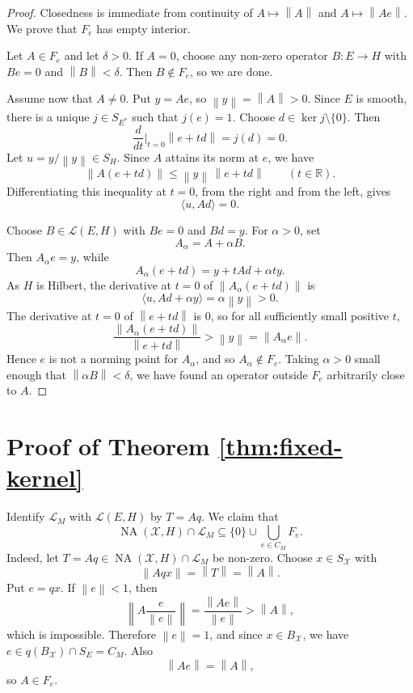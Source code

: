 \documentclass[11pt]{article}
\newcommand{\X}{\mathcal X}
\newcommand{\NA}{\operatorname{NA}}
\newcommand{\calL}{\mathcal L}
\newcommand{\R}{\mathbb R}
\newcommand{\norm}[1]{\left\lVert #1 \right\rVert}
\begin{document}
\begin{proof}
Closedness is immediate from continuity of \(A\mapsto \norm{A}\) and
\(A\mapsto \norm{Ae}\). We prove that \(F_e\) has empty interior.

Let \(A\in F_e\) and let \(\delta>0\). If \(A=0\), choose any non-zero
operator \(B:E\to H\) with \(Be=0\) and \(\norm{B}<\delta\). Then
\(B\notin F_e\), so we are done.

Assume now that \(A\neq0\). Put \(y=Ae\), so \(\norm{y}=\norm{A}>0\). Since
\(E\) is smooth, there is a unique \(j\in S_{E^*}\) such that \(j(e)=1\).
Choose \(d\in\ker j\setminus\{0\}\). Then
\[
  \frac{d}{dt}\Big|_{t=0}\norm{e+td}=j(d)=0.
\]
Let \(u=y/\norm{y}\in S_H\). Since \(A\) attains its norm at \(e\), we have
\[
  \norm{A(e+td)}\leq \norm{y}\,\norm{e+td}
  \qquad (t\in\R).
\]
Differentiating this inequality at \(t=0\), from the right and from the
left, gives
\[
  \langle u,Ad\rangle=0.
\]

Choose \(B\in\calL(E,H)\) with \(Be=0\) and \(Bd=y\). For \(\alpha>0\), set
\[
  A_\alpha=A+\alpha B.
\]
Then \(A_\alpha e=y\), while
\[
  A_\alpha(e+td)=y+tAd+\alpha t y.
\]
As \(H\) is Hilbert, the derivative at \(t=0\) of
\(\norm{A_\alpha(e+td)}\) is
\[
  \langle u,Ad+\alpha y\rangle
  =
  \alpha\norm{y}>0.
\]
The derivative at \(t=0\) of \(\norm{e+td}\) is \(0\), so for all sufficiently
small positive \(t\),
\[
  \frac{\norm{A_\alpha(e+td)}}{\norm{e+td}}
  >
  \norm{y}
  =
  \norm{A_\alpha e}.
\]
Hence \(e\) is not a norming point for \(A_\alpha\), and so
\(A_\alpha\notin F_e\). Taking \(\alpha>0\) small enough that
\(\norm{\alpha B}<\delta\), we have found an operator outside \(F_e\)
arbitrarily close to \(A\).
\end{proof}

\section*{Proof of Theorem \ref{thm:fixed-kernel}}

Identify \(\calL_M\) with \(\calL(E,H)\) by \(T=Aq\). We claim that
\[
  \NA(\X,H)\cap\calL_M
  \subseteq
  \{0\}\cup \bigcup_{e\in C_M} F_e.
\]
Indeed, let \(T=Aq\in\NA(\X,H)\cap\calL_M\) be non-zero. Choose
\(x\in S_\X\) with
\[
  \norm{Aq x}=\norm{T}=\norm{A}.
\]
Put \(e=qx\). If \(\norm{e}<1\), then
\[
  \left\|A\frac{e}{\norm{e}}\right\|
  =
  \frac{\norm{A e}}{\norm{e}}
  >
  \norm{A},
\]
which is impossible. Therefore \(\norm{e}=1\), and since \(x\in B_\X\), we
have \(e\in q(B_\X)\cap S_E=C_M\). Also
\[
  \norm{Ae}=\norm{A},
\]
so \(A\in F_e\).
\end{document}

